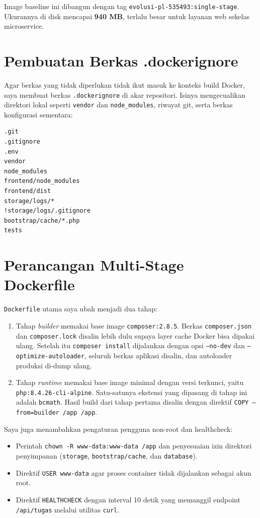 \documentclass[a4paper,oneside,12pt]{report}
\begin{document}
Image baseline ini dibangun dengan tag \texttt{evolusi-pl-535493:single-stage}. Ukurannya di disk mencapai \textbf{940 MB}, terlalu besar untuk layanan web sekelas microservice.

\section{Pembuatan Berkas .dockerignore}
Agar berkas yang tidak diperlukan tidak ikut masuk ke konteks build Docker, saya membuat berkas \texttt{.dockerignore} di akar repositori. Isinya mengecualikan direktori lokal seperti \texttt{vendor} dan \texttt{node\_modules}, riwayat git, serta berkas konfigurasi sementara:

\begin{lstlisting}[style=bashstyle,caption={Berkas \texttt{.dockerignore} pada repositori \texttt{evolusi-pl-535493}.}]
.git
.gitignore
.env
vendor
node_modules
frontend/node_modules
frontend/dist
storage/logs/*
!storage/logs/.gitignore
bootstrap/cache/*.php
tests
\end{lstlisting}

\section{Perancangan Multi-Stage Dockerfile}
\texttt{Dockerfile} utama saya ubah menjadi dua tahap:
\begin{enumerate}
    \item Tahap \textit{builder} memakai base image \texttt{composer:2.8.5}. Berkas \texttt{composer.json} dan \texttt{composer.lock} disalin lebih dulu supaya layer cache Docker bisa dipakai ulang. Setelah itu \texttt{composer install} dijalankan dengan opsi \texttt{--no-dev} dan \texttt{--optimize-autoloader}, seluruh berkas aplikasi disalin, dan autoloader produksi di-dump ulang.
    \item Tahap \textit{runtime} memakai base image minimal dengan versi terkunci, yaitu \texttt{php:8.4.26-cli-alpine}. Satu-satunya ekstensi yang dipasang di tahap ini adalah \texttt{bcmath}. Hasil build dari tahap pertama disalin dengan direktif \texttt{COPY --from=builder /app /app}.
\end{enumerate}

Saya juga menambahkan pengaturan pengguna non-root dan healthcheck:
\begin{itemize}
    \item Perintah \texttt{chown -R www-data:www-data /app} dan penyesuaian izin direktori penyimpanan (\texttt{storage}, \texttt{bootstrap/cache}, dan \texttt{database}).
    \item Direktif \texttt{USER www-data} agar proses container tidak dijalankan sebagai akun root.
    \item Direktif \texttt{HEALTHCHECK} dengan interval 10 detik yang memanggil endpoint \texttt{/api/tugas} melalui utilitas \texttt{curl}.
\end{itemize}
\end{document}
